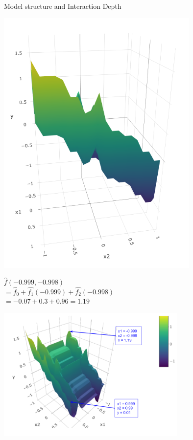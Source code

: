 \begin{vbframe}{Model structure and Interaction Depth}
\begin{minipage}[c]{0.3\textwidth}
  \includegraphics[width=0.75\textwidth, trim = 0 70 0 30, clip]{
  figure_man/boosting_interaction_depth1fit3D_x2.png}
\end{minipage}%

\vfill

\begin{minipage}[c]{0.4\textwidth}
  \footnotesize
  $\hat{f}(-0.999,-0.998)$\\
  $= \hat{f_0} + \hat{f_1}(-0.999) + \hat{f_2}(-0.998)$ \\
  $= -0.07 + 0.3 + 0.96 = 1.19$
\end{minipage}%
\begin{minipage}[c]{0.6\textwidth}
  \centering
  \includegraphics[width=0.7\textwidth]{figure/interaction_td1_d3.png}
\end{minipage}%


\end{vbframe}
